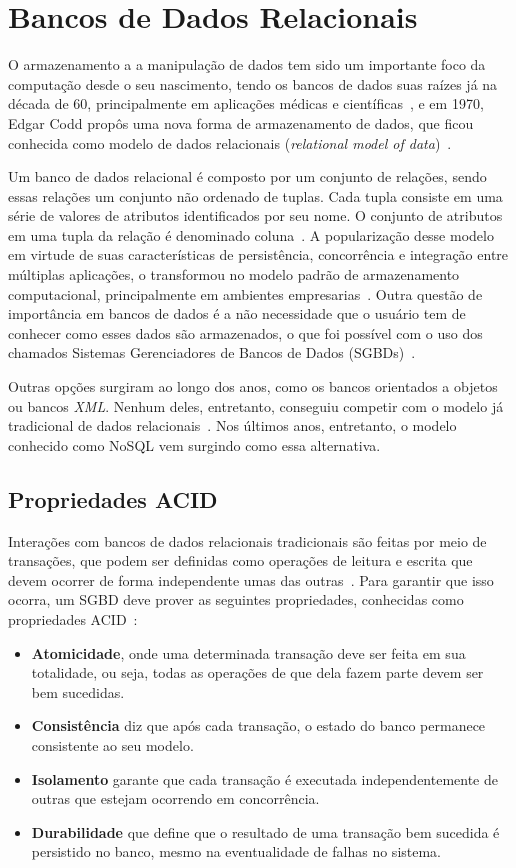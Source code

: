 

\section{Bancos de Dados Relacionais}
O armazenamento a a manipulação de dados tem sido um importante foco da computação desde o seu nascimento, tendo os bancos de dados suas raízes já na década de 60, principalmente em aplicações médicas e científicas~\cite{neufeld1986database}, e em 1970, Edgar Codd propôs uma nova forma de armazenamento de dados, que ficou conhecida como modelo de dados relacionais (\emph{relational model of data})~\cite{codd1970relational}. 

Um banco de dados relacional é composto por um conjunto de relações, sendo essas relações um conjunto não ordenado de tuplas. Cada tupla consiste em uma série de valores de atributos identificados por seu nome. O conjunto de atributos em uma tupla da relação é denominado coluna~\cite{heuser}. A popularização desse modelo em virtude de suas características de persistência, concorrência e integração entre múltiplas aplicações, o transformou no modelo padrão de armazenamento computacional, principalmente em ambientes empresarias~\cite{pramod}. Outra questão de importância em bancos de dados é a não necessidade que o usuário tem de conhecer como esses dados são armazenados, o que foi possível com o uso dos chamados Sistemas Gerenciadores de Bancos de Dados (SGBDs)~\cite{jan}.

Outras opções surgiram ao longo dos anos, como os bancos orientados a objetos ou bancos \emph{XML}. Nenhum deles, entretanto, conseguiu competir com o modelo já tradicional de dados relacionais~\cite{pramod}. Nos últimos anos, entretanto, o modelo conhecido como NoSQL vem surgindo como essa alternativa.
    

\subsection{Propriedades ACID}
	Interações com bancos de dados relacionais tradicionais são feitas por meio de transações, que podem ser definidas como operações de leitura e escrita que devem ocorrer de forma independente umas das outras~\cite{dmsbook}. Para garantir que isso ocorra, um SGBD deve prover as seguintes propriedades, conhecidas como propriedades ACID~\cite{haerder}:
	\begin{itemize}
	\item \textbf{Atomicidade}, onde uma determinada transação deve ser feita em sua totalidade, ou seja, todas as operações de que dela fazem parte devem ser bem sucedidas.
	\item \textbf{Consistência} diz que após cada transação, o estado do banco permanece consistente ao seu modelo.
	\item \textbf{Isolamento} garante que cada transação é executada independentemente de outras que estejam ocorrendo em concorrência.
	\item \textbf{Durabilidade} que define que o resultado de uma transação bem sucedida é persistido no banco, mesmo na eventualidade de falhas no sistema.
	\end{itemize}

